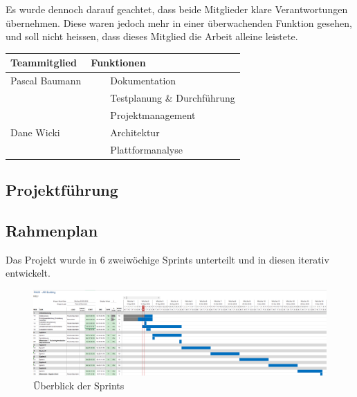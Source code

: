 \documentclass[a4paper]{scrreprt}
\newcommand{\tabitem}{~~\llap{\textbullet}~~}
\begin{document}
Es wurde dennoch darauf geachtet, dass beide Mitglieder klare Verantwortungen übernehmen. Diese waren jedoch mehr in einer überwachenden Funktion gesehen, und soll nicht heissen, dass dieses Mitglied die Arbeit alleine leistete.

\vspace{1em}

\begin{tabularx}{\textwidth}{|X|X|}
	\hline
	\textbf{Teammitglied} & \textbf{Funktionen} \\
	\hline
	Pascal Baumann & \tabitem Dokumentation \\
	& \tabitem Testplanung \& Durchführung \\
	& \tabitem Projektmanagement \\
	\hline
	Dane Wicki & \tabitem Architektur \\
	& \tabitem Plattformanalyse \\
	\hline
\end{tabularx}

\newpage
\subsection{Projektführung}

\subsection{Rahmenplan}

Das Projekt wurde in 6 zweiwöchige Sprints unterteilt und in diesen iterativ entwickelt.

\vspace{1em}

\begin{figure}[h!]
	\includegraphics[keepaspectratio, width=\textwidth]{Rahmenplan}
	\caption{Überblick der Sprints}
\end{figure}
\end{document}
